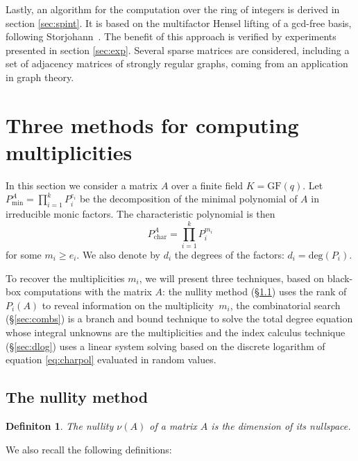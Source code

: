 \documentclass{article}
\newtheorem{defn}[thm]{Definiton}
\newcommand{\minpoly}{{P_\text{min}^A}}
\newcommand{\charpoly}{{P_\text{char}^A}}
\begin{document}
Lastly, an algorithm for the computation over the ring of integers is derived in
section \ref{sec:spint}.
It is based on the  multifactor Hensel lifting of a gcd-free basis, following Storjohann~\cite{Storjohann:2000:Frob}. 
The benefit of this approach is verified by experiments
presented in section \ref{sec:exp}. Several sparse matrices are considered,
including a set of  adjacency matrices of strongly regular graphs, coming from an
application in graph theory.













\section{Three methods for computing multiplicities}\label{sec:multip}

In this section we consider a matrix $A$ over a finite field
$K=\text{GF}(q)$.
Let 
$\minpoly = \prod_{i=1}^k P_i^{e_i}
$
be the decomposition of the minimal polynomial of $A$ in irreducible monic
factors. The characteristic polynomial is then 
\begin{equation}\label{eq:charpol}
\charpoly = \prod_{i=1}^k P_i^{m_i}
\end{equation} 
for some $m_i \geq e_i$. We also denote by $d_i$ the degrees of
the factors: $d_i = \text{deg}(P_i)$.

To recover the multiplicities $m_i$, we will present three techniques,
based on black-box computations with the matrix $A$:
the nullity method (\S \ref{sec:nullity}) uses the
rank of $P_i(A)$ to reveal information on the multiplicity~$m_i$, 
the combinatorial search (\S \ref{sec:combs}) is a branch and bound
technique to solve the total degree equation whose integral unknowns are the
multiplicities and the index calculus technique (\S \ref{sec:dlog}) uses a
linear system solving based  on the discrete logarithm  
 of equation \ref{eq:charpol} evaluated in random values.


\subsection{The nullity method}
\label{sec:nullity}
\begin{defn}The nullity  $\nu(A)$ of a matrix $A$  is the dimension of its nullspace.
\end{defn}
We also recall the following definitions:
\end{document}
